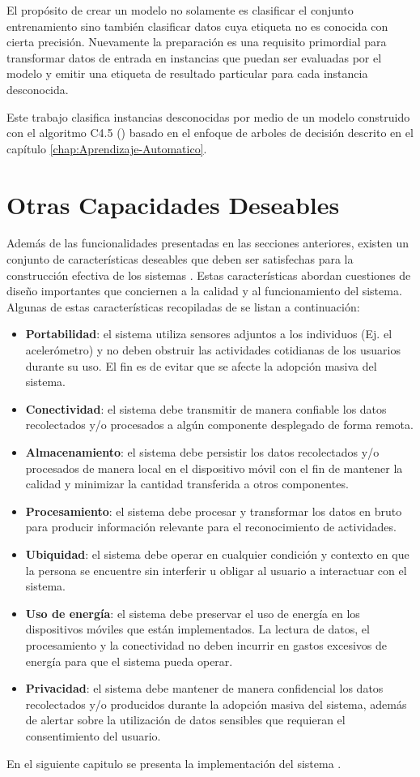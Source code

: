 El propósito de crear un modelo no solamente es clasificar el conjunto
entrenamiento sino también clasificar datos cuya etiqueta no es conocida
con cierta precisión. Nuevamente la preparación es una requisito primordial
para transformar datos de entrada en instancias que puedan ser evaluadas
por el modelo y emitir una etiqueta de resultado particular para cada
instancia desconocida.

Este trabajo clasifica instancias desconocidas por medio de un modelo
construido con el algoritmo C4.5 () basado en el
enfoque de arboles de decisión descrito en el capítulo \ref{chap:Aprendizaje-Automatico}.

\section{Otras Capacidades Deseables}

\label{ssec46:caracteristicas}Además de las funcionalidades presentadas
en las secciones anteriores, existen un conjunto de características
deseables que deben ser satisfechas para la construcción efectiva
de los sistemas . Estas características abordan cuestiones
de diseño importantes que conciernen a la calidad y al funcionamiento
del sistema. Algunas de estas características recopiladas de \cite{Choudhury2008,LaraLabrador2013}
se listan a continuación:
\begin{itemize}
\item \textbf{Portabilidad}: el sistema utiliza sensores adjuntos a los
individuos (Ej. el acelerómetro) y no deben obstruir las actividades
cotidianas de los usuarios durante su uso. El fin es de evitar que
se afecte la adopción masiva del sistema. 
\item \textbf{Conectividad}: el sistema debe transmitir de manera confiable
los datos recolectados y/o procesados a algún componente desplegado
de forma remota. 
\item \textbf{Almacenamiento}: el sistema debe persistir los datos recolectados
y/o procesados de manera local en el dispositivo móvil con el fin
de mantener la calidad y minimizar la cantidad transferida a otros
componentes.
\item \textbf{Procesamiento}: el sistema debe procesar y transformar los
datos en bruto para producir información relevante para el reconocimiento
de actividades.
\item \textbf{Ubiquidad}: el sistema debe operar en cualquier condición
y contexto en que la persona se encuentre sin interferir u obligar
al usuario a interactuar con el sistema.
\item \textbf{Uso de energía}: el sistema debe preservar el uso de energía
en los dispositivos móviles que están implementados. La lectura de
datos, el procesamiento y la conectividad no deben incurrir en gastos
excesivos de energía para que el sistema pueda operar.
\item \textbf{Privacidad}: el sistema debe mantener de manera confidencial
los datos recolectados y/o producidos durante la adopción masiva del
sistema, además de alertar sobre la utilización de datos sensibles
que requieran el consentimiento del usuario.
\end{itemize}
En el siguiente capitulo se presenta la implementación del sistema
.
